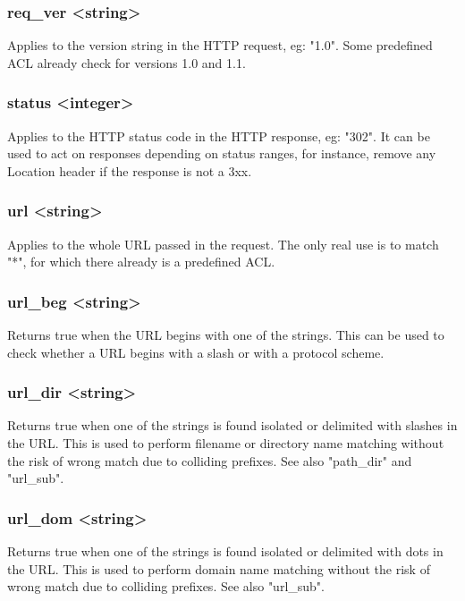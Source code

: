\subsubsection[req\_ver]{req\_ver <string>}
  Applies to the version string in the HTTP request, eg: "1.0". Some predefined
  ACL already check for versions 1.0 and 1.1.

\subsubsection[status]{status <integer>}
  Applies to the HTTP status code in the HTTP response, eg: "302". It can be
  used to act on responses depending on status ranges, for instance, remove
  any Location header if the response is not a 3xx.

\subsubsection[url]{url <string>}
  Applies to the whole URL passed in the request. The only real use is to match
  "*", for which there already is a predefined ACL.

\subsubsection[url\_beg]{url\_beg <string>}
  Returns true when the URL begins with one of the strings. This can be used to
  check whether a URL begins with a slash or with a protocol scheme.

\subsubsection[url\_dir]{url\_dir <string>}
  Returns true when one of the strings is found isolated or delimited with
  slashes in the URL. This is used to perform filename or directory name
  matching without the risk of wrong match due to colliding prefixes. See also
  "path\_dir" and "url\_sub".

\subsubsection[url\_dom]{url\_dom <string>}
  Returns true when one of the strings is found isolated or delimited with dots
  in the URL. This is used to perform domain name matching without the risk of
  wrong match due to colliding prefixes. See also "url\_sub".

